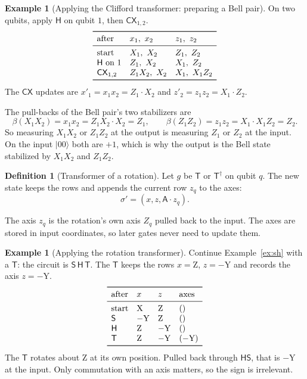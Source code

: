 \documentclass[11pt]{article}
\theoremstyle{definition}
\newtheorem{definition}[theorem]{Definition}
\newtheorem{example}[theorem]{Example}
\theoremstyle{remark}
\newcommand{\adj}{^{\dagger}}
\newcommand{\Ax}{\mathsf{A}}
\newcommand{\back}{\beta}
\newcommand{\tX}{\mathrm{X}}
\newcommand{\tY}{\mathrm{Y}}
\newcommand{\tZ}{\mathrm{Z}}
\newcommand{\gate}[1]{\mathsf{#1}}
\begin{document}
\begin{example}[Applying the Clifford transformer: preparing a Bell pair]\label{ex:bell}
On two qubits, apply $\gate H$ on qubit $1$, then $\gate{CX}_{1,2}$.
\[
\begin{array}{lll}
\toprule
\text{after} & x_1,\ x_2 & z_1,\ z_2 \\
\midrule
\text{start} & X_1,\ X_2 & Z_1,\ Z_2 \\
\gate H \text{ on } 1 & Z_1,\ X_2 & X_1,\ Z_2 \\
\gate{CX}_{1,2} & Z_1X_2,\ X_2 & X_1,\ X_1Z_2 \\
\bottomrule
\end{array}
\]
The $\gate{CX}$ updates are $x'_1 = x_1 x_2 = Z_1 \cdot X_2$ and
$z'_2 = z_1 z_2 = X_1 \cdot Z_2$.

The pull-backs of the Bell pair's two stabilizers are
\[
  \back(X_1X_2) = x_1 x_2 = Z_1X_2 \cdot X_2 = Z_1,
  \qquad
  \back(Z_1Z_2) = z_1 z_2 = X_1 \cdot X_1Z_2 = Z_2 .
\]
So measuring $X_1X_2$ or $Z_1Z_2$ at the output is measuring $Z_1$ or $Z_2$ at the input.
On the input $|00\rangle$ both are $+1$, which is why the output is the Bell state
stabilized by $X_1X_2$ and $Z_1Z_2$.
\end{example}

\begin{definition}[Transformer of a rotation]\label{def:rot-step}
Let $g$ be $\gate{T}$ or $\gate{T}\adj$ on qubit $q$. The new state keeps the rows and
appends the current row $z_q$ to the axes:
\[
  \sigma' = (x, z, \Ax \cdot z_q).
\]
\end{definition}

The axis $z_q$ is the rotation's own axis $Z_q$ pulled back to the input. The axes are
stored in input coordinates, so later gates never need to update them.

\begin{example}[Applying the rotation transformer]\label{ex:sht}
Continue Example~\ref{ex:sh} with a $\gate T$: the circuit is $\gate S\,\gate H\,\gate T$.
The $\gate T$ keeps the rows $x = \tZ$, $z = -\tY$ and records the axis $z = -\tY$.
\[
\begin{array}{llll}
\toprule
\text{after} & x & z & \text{axes} \\
\midrule
\text{start} & \tX & \tZ & () \\
\gate S & -\tY & \tZ & () \\
\gate H & \tZ & -\tY & () \\
\gate T & \tZ & -\tY & (-\tY) \\
\bottomrule
\end{array}
\]
The $\gate T$ rotates about $\tZ$ at its own position. Pulled back through $\gate H\gate S$,
that is $-\tY$ at the input. Only commutation with an axis matters, so the sign is
irrelevant.
\end{example}
\end{document}
